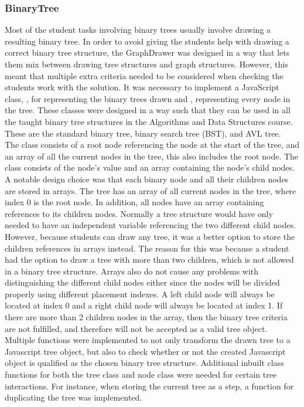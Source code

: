 \subsubsection{BinaryTree}
Most of the student tasks involving binary trees usually involve drawing a resulting binary tree. In order to avoid giving the students help with drawing a correct binary tree structure, the GraphDrawer was designed in a way that lets them mix between drawing tree structures and graph structures. However, this meant that multiple extra criteria needed to be considered when checking the students work with the solution. It was necessary to implement a JavaScript class, , for representing the binary trees drawn and , representing every node in the tree. These classes were designed in a way such that they can be used in all the taught binary tree structures in the Algorithms and Data Structures course. These are the standard binary tree, binary search tree (BST), and AVL tree. 
\\[11pt]
The  class consists of a root node referencing the node at the start of the tree, and an array of all the current nodes in the tree, this also includes the root node. The  class consists of the node's value and an array containing the node's child nodes. A notable design choice was that each binary node and all their children nodes are stored in arrays. The tree has an array of all current nodes in the tree, where index 0 is the root node. In addition, all nodes have an array containing references to its children nodes. Normally a tree structure would have only needed to have an independent variable referencing the two different child nodes. However, because students can draw any tree, it was a better option to store the children references in arrays instead. The reason for this was because a student had the option to draw a tree with more than two children, which is not allowed in a binary tree structure. Arrays also do not cause any problems with distinguishing the different child nodes either since the nodes will be divided properly using different placement indexes. A left child node will always be located at index 0 and a right child node will always be located at index 1. If there are more than 2 children nodes in the array, then the binary tree criteria are not fulfilled, and therefore will not be accepted as a valid tree object. Multiple functions were implemented to not only transform the drawn tree to a Javascript tree object, but also to check whether or not the created Javascript object is qualified as the chosen binary tree structure. Additional inbuilt class functions for both the tree class and node class were needed for certain tree interactions. For instance, when storing the current tree as a step, a function for duplicating the tree was implemented.
